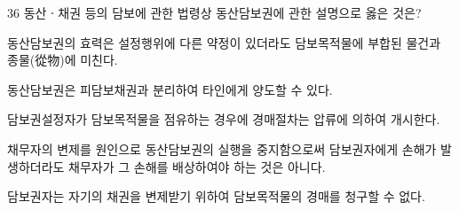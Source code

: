 \begin{question}{36}
동산ㆍ채권 등의 담보에 관한 법령상 동산담보권에 관한 설명으로 옳은 것은?
\begin{choices}
  \item 동산담보권의 효력은 설정행위에 다른 약정이 있더라도 담보목적물에 부합된 물건과 종물(從物)에 미친다.
  \item 동산담보권은 피담보채권과 분리하여 타인에게 양도할 수 있다.
  \item 담보권설정자가 담보목적물을 점유하는 경우에 경매절차는 압류에 의하여 개시한다.
  \item 채무자의 변제를 원인으로 동산담보권의 실행을 중지함으로써 담보권자에게 손해가 발생하더라도 채무자가 그 손해를 배상하여야 하는 것은 아니다.
  \item 담보권자는 자기의 채권을 변제받기 위하여 담보목적물의 경매를 청구할 수 없다.
\end{choices}
\end{question}
